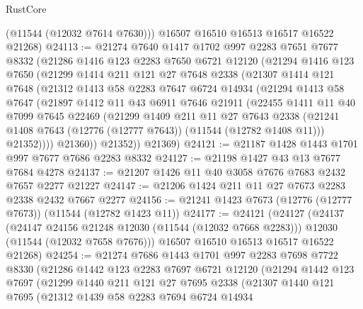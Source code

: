 \begin{lexlean}{RustCore}
\begin{coremodule}
        (@11544 (@12032 @7614 @7630)))
      @16507
      @16510
      @16513
      @16517
      @16522
      @21268)
@24113 := @21274
    @7640
    @1417
    @1702
    @997
    @2283
    @7651
    @7677
    @8332
    (@21286
      @1416
      @123
      @2283
      @7650
      @6721
      @12120
      (@21294
        @1416
        @123
        @7650
        (@21299
          @1414
          @211
          @121
          @27
          @7648
          @2338
          (@21307
            @1414
            @121
            @7648
            (@21312
              @1413
              @58
              @2283
              @7647
              @6724
              @14934
              (@21294
                @1413
                @58
                @7647
                (@21897
                  @1412
                  @11
                  @43
                  @6911
                  @7646
                  @21911
                  (@22455
                    @1411
                    @11
                    @40
                    @7099
                    @7645
                    @22469
                    (@21299
                      @1409
                      @211
                      @11
                      @27
                      @7643
                      @2338
                      (@21241 @1408 @7643 (@12776 (@12777 @7643)) (@11544 (@12782 @1408 @11)))
                      @21352))))
              @21360))
          @21352))
      @21369)
@24121 := @21187 @1428 @1443 @1701 @997 @7677 @7686 @2283 @8332
@24127 := @21198 @1427 @43 @13 @7677 @7684 @4278
@24137 := @21207 @1426 @11 @40 @3058 @7676 @7683 @2432 @7657 @2277 @21227
@24147 := @21206 @1424 @211 @11 @27 @7673 @2283 @2338 @2432 @7667 @2277
@24156 := @21241 @1423 @7673 (@12776 (@12777 @7673)) (@11544 (@12782 @1423 @11))
@24177 := @24121
    (@24127
      (@24137
        (@24147 @24156 @21248 @12030 (@11544 (@12032 @7668 @2283)))
        @12030
        (@11544 (@12032 @7658 @7676)))
      @16507
      @16510
      @16513
      @16517
      @16522
      @21268)
@24254 := @21274
    @7686
    @1443
    @1701
    @997
    @2283
    @7698
    @7722
    @8330
    (@21286
      @1442
      @123
      @2283
      @7697
      @6721
      @12120
      (@21294
        @1442
        @123
        @7697
        (@21299
          @1440
          @211
          @121
          @27
          @7695
          @2338
          (@21307
            @1440
            @121
            @7695
            (@21312
              @1439
              @58
              @2283
              @7694
              @6724
              @14934

\end{coremodule}
\end{lexlean}
